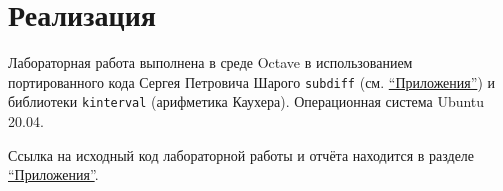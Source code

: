 \section{Реализация}

Лабораторная работа выполнена в среде Octave в использованием портированного кода Сергея Петровича Шарого \texttt{subdiff} (см. \hyperref[app]{``Приложения''}) и библиотеки \texttt{kinterval} (арифметика Каухера). Операционная система Ubuntu 20.04.

Ссылка на исходный код лабораторной работы и отчёта находится в разделе \hyperref[app]{``Приложения''}.